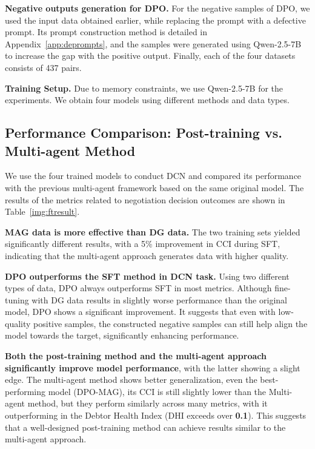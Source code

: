 \textbf{Negative outputs generation for DPO. }For the negative samples of DPO, we used the input data obtained earlier, while replacing the prompt with a defective prompt. Its prompt construction method is detailed in Appendix~\ref{app:deprompts}, and the samples were generated using Qwen-2.5-7B to increase the gap with the positive output. Finally, each of the four datasets consists of 437 pairs.

\textbf{Training Setup.} Due to memory constraints, we use Qwen-2.5-7B for the experiments. We obtain four models using different methods and data types. 

\subsection{Performance Comparison: Post-training vs. Multi-agent Method}

We use the four trained models to conduct DCN and compared its performance with the previous multi-agent framework based on the same original model. The results of the metrics related to negotiation decision outcomes are shown in Table~\ref{img:ftresult}.

\textbf{MAG data is more effective than DG data. }The two training sets yielded significantly different results, with a 5\% improvement in CCI during SFT, indicating that the multi-agent approach generates data with higher quality.

\textbf{DPO outperforms the SFT method in DCN task.} Using two different types of data, DPO always outperforms SFT in most metrics. Although fine-tuning with DG data results in slightly worse performance than the original model, DPO shows a significant improvement. It suggests that even with low-quality positive samples, the constructed negative samples can still help align the model towards the target, significantly enhancing performance.

\textbf{Both the post-training method and the multi-agent approach significantly improve model performance}, with the latter showing a slight edge. The multi-agent method shows better generalization, even the best-performing model (DPO-MAG), its CCI is still slightly lower than the Multi-agent method, but they perform similarly across many metrics, with it outperforming in the Debtor Health Index (DHI exceeds over \textbf{0.1}). This suggests that a well-designed post-training method can achieve results similar to the multi-agent approach.
